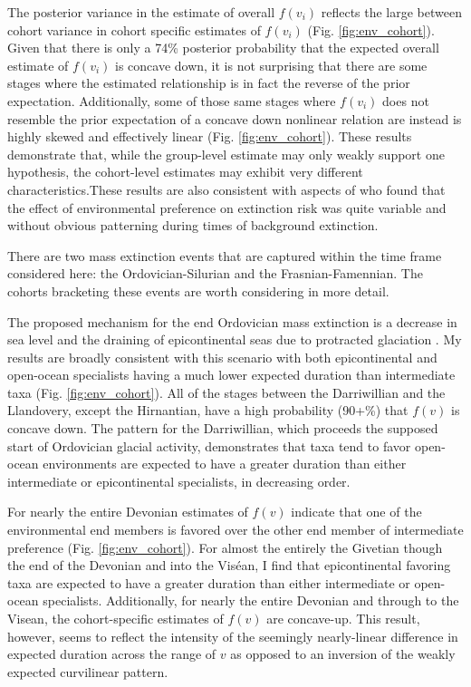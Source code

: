 \documentclass{article}
\begin{document}
The posterior variance in the estimate of overall \(f(v_{i})\) reflects the large between cohort variance in cohort specific estimates of \(f(v_{i})\) (Fig. \ref{fig:env_cohort}). Given that there is only a 74\% posterior probability that the expected overall estimate of \(f(v_{i})\) is concave down, it is not surprising that there are some stages where the estimated relationship is in fact the reverse of the prior expectation. Additionally, some of those same stages where \(f(v_{i})\) does not resemble the prior expectation of a concave down nonlinear relation are instead is highly skewed and effectively linear (Fig. \ref{fig:env_cohort}). These results demonstrate that, while the group-level estimate may only weakly support one hypothesis, the cohort-level estimates may exhibit very different characteristics.These results are also consistent with aspects of \citet{Miller2009a} who found that the effect of environmental preference on extinction risk was quite variable and without obvious patterning during times of background extinction.


There are two mass extinction events that are captured within the time frame considered here: the Ordovician-Silurian and the Frasnian-Famennian. The cohorts bracketing these events are worth considering in more detail.


The proposed mechanism for the end Ordovician mass extinction is a decrease in sea level and the draining of epicontinental seas due to protracted glaciation \citep{Sheehan2001b,Johnson1974}. My results are broadly consistent with this scenario with both epicontinental and open-ocean specialists having a much lower expected duration than intermediate taxa (Fig. \ref{fig:env_cohort}). All of the stages between the Darriwillian and the Llandovery, except the Hirnantian, have a high probability (90+\%) that \(f(v)\) is concave down. The pattern for the Darriwillian, which proceeds the supposed start of Ordovician glacial activity, demonstrates that taxa tend to favor open-ocean environments are expected to have a greater duration than either intermediate or epicontinental specialists, in decreasing order.

For nearly the entire Devonian estimates of \(f(v)\) indicate that one of the environmental end members is favored over the other end member of intermediate preference (Fig. \ref{fig:env_cohort}). For almost the entirely the Givetian though the end of the Devonian and into the Vis\'{e}an, I find that epicontinental favoring taxa are expected to have a greater duration than either intermediate or open-ocean specialists. Additionally, for nearly the entire Devonian and through to the Visean, the cohort-specific estimates of \(f(v)\) are concave-up. This result, however, seems to reflect the intensity of the seemingly nearly-linear difference in expected duration across the range of \(v\) as opposed to an inversion of the weakly expected curvilinear pattern.
\end{document}
